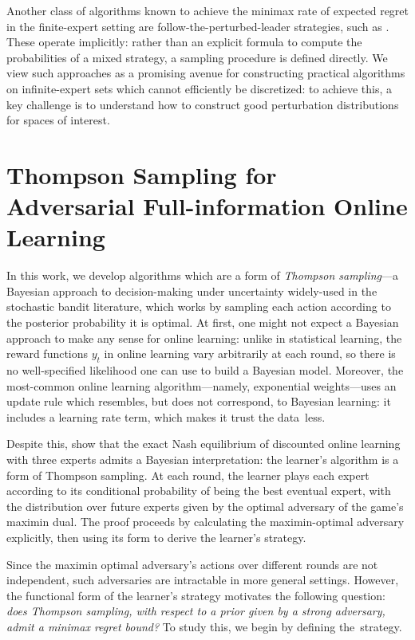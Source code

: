 \documentclass[preprint,12pt]{colt2025}
\begin{document}
Another class of algorithms known to achieve the minimax rate of expected regret in the finite-expert setting are follow-the-perturbed-leader strategies, such as \textcite{kalai2005efficient,devroye2013prediction,vanerven14,abernethy2016perturbation}. 
These operate implicitly: rather than an explicit formula to compute the probabilities of a mixed strategy, a sampling procedure is defined directly. 
We view such approaches as a promising avenue for constructing practical algorithms on infinite-expert sets which cannot efficiently be discretized: to achieve this, a key challenge is to understand how to construct good perturbation distributions for spaces of interest.


\section{Thompson Sampling for Adversarial Full-information Online Learning}
\label{sec:general-results}

In this work, we develop algorithms which are a form of \emph{Thompson sampling}---a Bayesian approach to decision-making under uncertainty widely-used in the stochastic bandit literature, which works by sampling each action according to the posterior probability it is optimal.
At first, one might not expect a Bayesian approach to make any sense for online learning: unlike in statistical learning, the reward functions $y_t$ in online learning vary arbitrarily at each round, so there is no well-specified likelihood one can use to build a Bayesian model.
Moreover, the most-common online learning algorithm---namely, exponential weights---uses an update rule which resembles, but does not correspond, to Bayesian learning: it includes a learning rate term, which makes it trust the data~less.

Despite this, \textcite{gravin2016towards} show that the exact Nash equilibrium of discounted online learning with three experts admits a Bayesian interpretation: the learner's algorithm is a form of Thompson sampling.
At each round, the learner plays each expert according to its conditional probability of being the best eventual expert, with the distribution over future experts given by the optimal adversary of the game's maximin dual.
The proof proceeds by calculating the maximin-optimal adversary explicitly, then using its form to derive the learner's strategy.

Since the maximin optimal adversary's actions over different rounds are not independent, such adversaries are intractable in more general settings.
However, the functional form of the learner's strategy motivates the following question: \emph{does Thompson sampling, with respect to a prior given by a strong adversary, admit a minimax regret bound?}
To study this, we begin by defining the~strategy.
\end{document}
